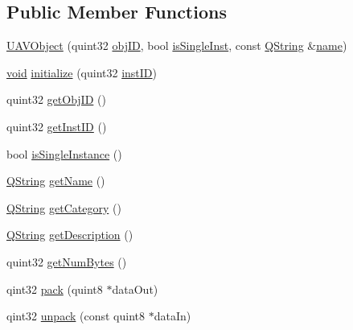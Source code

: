 \subsection*{Public Member Functions}
\begin{DoxyCompactItemize}
\item 
\hyperlink{group___u_a_v_objects_plugin_gafee3b68612b44afbe6dd82f663126f09}{U\-A\-V\-Object} (quint32 \hyperlink{group___u_a_v_objects_plugin_gafc50acdaa311c9fd9aaddf90fd578c14}{obj\-I\-D}, bool \hyperlink{group___u_a_v_objects_plugin_gaa279cad3a000cc930e7f386672426bcb}{is\-Single\-Inst}, const \hyperlink{group___u_a_v_objects_plugin_gab9d252f49c333c94a72f97ce3105a32d}{Q\-String} \&\hyperlink{glext_8h_ad977737dfc9a274a62741b9500c49a32}{name})
\item 
\hyperlink{group___u_a_v_objects_plugin_ga444cf2ff3f0ecbe028adce838d373f5c}{void} \hyperlink{group___u_a_v_objects_plugin_ga1ed2d21fdcea1cc31ebc6c669ba49720}{initialize} (quint32 \hyperlink{group___u_a_v_objects_plugin_gad8d656542a04e9fbef607ff178f6d9d3}{inst\-I\-D})
\item 
quint32 \hyperlink{group___u_a_v_objects_plugin_gaad45ab83a511083bfe60df0c244e9b88}{get\-Obj\-I\-D} ()
\item 
quint32 \hyperlink{group___u_a_v_objects_plugin_gaf465e2bde7a1e41ba94c19eac2ba9b80}{get\-Inst\-I\-D} ()
\item 
bool \hyperlink{group___u_a_v_objects_plugin_gac05d3c2bd0fd07947707562f66ddfc18}{is\-Single\-Instance} ()
\item 
\hyperlink{group___u_a_v_objects_plugin_gab9d252f49c333c94a72f97ce3105a32d}{Q\-String} \hyperlink{group___u_a_v_objects_plugin_ga92eb502fc16ba82b924a430acaa55f46}{get\-Name} ()
\item 
\hyperlink{group___u_a_v_objects_plugin_gab9d252f49c333c94a72f97ce3105a32d}{Q\-String} \hyperlink{group___u_a_v_objects_plugin_gae829aa2dbab661a65f9f805caa8c67d1}{get\-Category} ()
\item 
\hyperlink{group___u_a_v_objects_plugin_gab9d252f49c333c94a72f97ce3105a32d}{Q\-String} \hyperlink{group___u_a_v_objects_plugin_ga319c487a42b628a2e83274c89fa77625}{get\-Description} ()
\item 
quint32 \hyperlink{group___u_a_v_objects_plugin_gafa1288a7ab0b65c3f81c4312d7cfee78}{get\-Num\-Bytes} ()
\item 
qint32 \hyperlink{group___u_a_v_objects_plugin_ga4afcaf928b2868be5a57d96a2b251318}{pack} (quint8 $\ast$data\-Out)
\item 
qint32 \hyperlink{group___u_a_v_objects_plugin_ga4ec5169680d4a03161752e98fd98a3b6}{unpack} (const quint8 $\ast$data\-In)

\end{DoxyCompactItemize}
